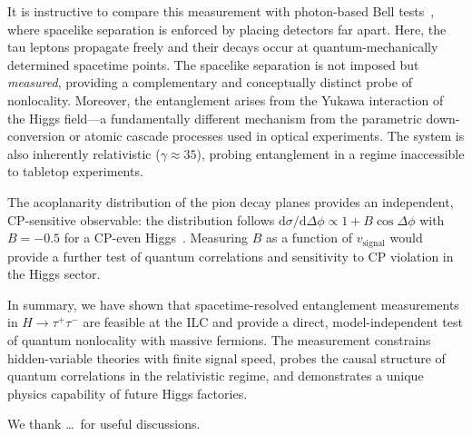 \documentclass[prl,twocolumn,superscriptaddress,floatfix]{revtex4-2}
\newcommand{\tautau}{\tau^+\tau^-}
\newcommand{\Htautau}{H\!\to\!\tautau}
\newcommand{\vsig}{v_{\mathrm{signal}}}
\begin{document}
It is instructive to compare this measurement with photon-based Bell
tests~\cite{Aspect1982,Hensen2015,BigBell2018}, where spacelike
separation is enforced by placing detectors far apart.  Here, the tau
leptons propagate freely and their decays occur at quantum-mechanically
determined spacetime points.  The spacelike separation is not imposed
but \emph{measured}, providing a complementary and conceptually
distinct probe of nonlocality.  Moreover, the entanglement arises from
the Yukawa interaction of the Higgs field---a fundamentally different
mechanism from the parametric down-conversion or atomic cascade processes
used in optical experiments.  The system is also inherently relativistic
($\gamma\approx 35$), probing entanglement in a regime inaccessible to
tabletop experiments.

The acoplanarity distribution of the pion decay planes provides an
independent, CP-sensitive observable: the distribution follows
$\mathrm{d}\sigma/\mathrm{d}\Delta\phi \propto 1 + B\cos\Delta\phi$
with $B=-0.5$ for a CP-even Higgs~\cite{Bower2002,Desch2004}.
Measuring $B$ as a function of $\vsig$ would provide a further test
of quantum correlations and sensitivity to CP violation in the Higgs
sector.

In summary, we have shown that spacetime-resolved entanglement
measurements in $\Htautau$ are feasible at the ILC and provide a
direct, model-independent test of quantum nonlocality with massive
fermions.  The measurement constrains hidden-variable theories with
finite signal speed, probes the causal structure of quantum
correlations in the relativistic regime, and demonstrates a unique
physics capability of future Higgs factories.

\begin{acknowledgments}
We thank \ldots\
for useful discussions.
\end{acknowledgments}
\end{document}
